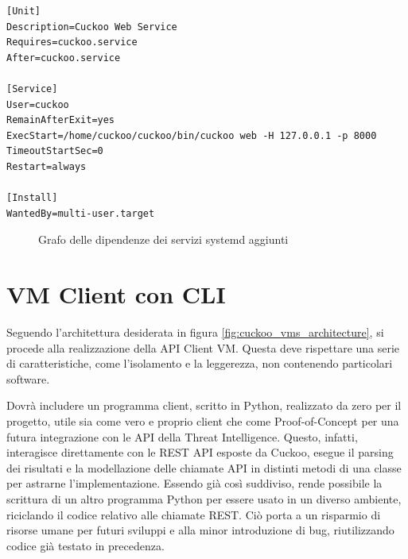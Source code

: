 \begin{code}
\begin{verbatim}
[Unit]
Description=Cuckoo Web Service
Requires=cuckoo.service
After=cuckoo.service

[Service]
User=cuckoo
RemainAfterExit=yes
ExecStart=/home/cuckoo/cuckoo/bin/cuckoo web -H 127.0.0.1 -p 8000
TimeoutStartSec=0
Restart=always

[Install]
WantedBy=multi-user.target
\end{verbatim}
\label{lst:systemd-unit-example}
\caption{Esempio di systemd unit per il servizio Web}
\end{code}
\bigskip

\begin{figure}[htbp]
\centering
{}
\caption{Grafo delle dipendenze dei servizi systemd aggiunti}
\label{fig:systemd-cuckoo-dependency-graph}
\end{figure}

\section{VM Client con CLI}
Seguendo l'architettura desiderata in figura \ref{fig:cuckoo_vms_architecture},
si procede alla realizzazione della API Client VM.
Questa deve rispettare una serie di caratteristiche, come l'isolamento e la leggerezza, non contenendo particolari software.

Dovrà includere un programma client, scritto in Python, realizzato da zero per il progetto, utile sia come vero e proprio client che come Proof-of-Concept per una futura integrazione con le API della Threat Intelligence. Questo, infatti, interagisce direttamente con le REST API esposte da Cuckoo, esegue il parsing dei risultati e la modellazione delle chiamate API in distinti metodi di una classe per astrarne l'implementazione.
Essendo già così suddiviso, rende possibile la scrittura di un altro programma Python per essere usato in un diverso ambiente, riciclando il codice relativo alle chiamate REST. Ciò porta a un risparmio di risorse umane per futuri sviluppi e alla minor introduzione di bug, riutilizzando codice già testato in precedenza.


